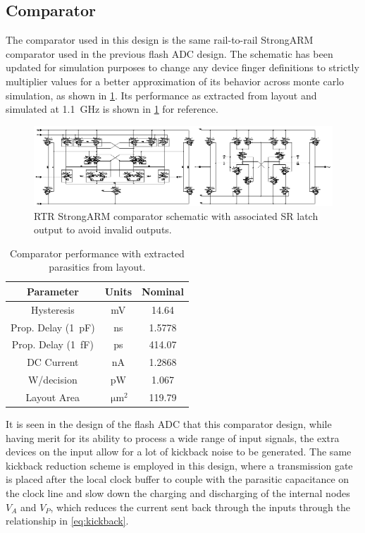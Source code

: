 \documentclass[11pt,letterpaper]{article}
\begin{document}
\subsection{Comparator}

The comparator used in this design is the same rail-to-rail StrongARM comparator used in the previous flash ADC design. The schematic has been updated for simulation purposes to change any device finger definitions to strictly multiplier values for a better approximation of its behavior across monte carlo simulation, as shown in \cref{fig:comp_sch}. Its performance as extracted from layout and simulated at \qty{1.1}{\GHz} is shown in \cref{tab:comp_perf} for reference.

\begin{figure}[htbp!]
		\centering
	    \includegraphics[width=\textwidth]{images/sch_comp_sar.eps}
		\caption{RTR StrongARM comparator schematic with associated SR latch output to avoid invalid outputs.}\label{fig:comp_sch}
\end{figure}

\begin{table}[]
    \centering
    \begin{tabular}{ccc}
    \toprule
        Parameter & Units & Nominal \\
    \midrule
        Hysteresis & mV & 14.64 \\
        Prop. Delay (\qty{1}{\pF}) & ns & 1.5778 \\
        Prop. Delay (\qty{1}{\fF}) & ps & 414.07 \\
        DC Current & nA & 1.2868 \\
        W/decision & pW & 1.067 \\
        Layout Area & \(\qty{}{\um^2}\) & 119.79 \\
    \bottomrule
        
    \end{tabular}
    \caption{Comparator performance with extracted parasitics from layout.}\label{tab:comp_perf}
\end{table}

It is seen in the design of the flash ADC that this comparator design, while having merit for its ability to process a wide range of input signals, the extra devices on the input allow for a lot of kickback noise to be generated. The same kickback reduction scheme is employed in this design, where a transmission gate is placed after the local clock buffer to couple with the parasitic capacitance on the clock line and slow down the charging and discharging of the internal nodes \(V_A\) and \(V_P\), which reduces the current sent back through the inputs through the relationship in \cref{eq:kickback}.
\end{document}
